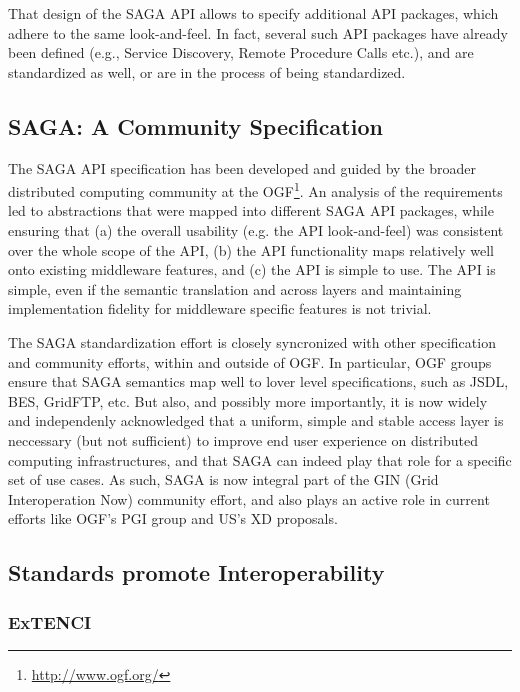 \documentclass[10pt,conference,final,letterpaper,twoside,twocolumn,]{IEEEtran}
\begin{document}
  That design of the SAGA API allows to specify additional API
  packages, which adhere to the same look-and-feel.  In fact, several
  such API packages have already been defined (e.g., Service
  Discovery, Remote Procedure Calls etc.), and are standardized as
  well, or are in the process of being standardized.

 \subsection{SAGA: A Community Specification}

  The SAGA API specification has been developed and guided by the
  broader distributed computing community at the
  OGF\footnote{\url{http://www.ogf.org/}}.  An analysis of the
  requirements led to abstractions that were mapped into different
  SAGA API packages, while ensuring that (a) the overall usability
  (e.g. the API look-and-feel) was consistent over the whole scope of
  the API, (b) the API functionality maps relatively well onto
  existing middleware features, and (c) the API is simple to use.  The
  API is simple, even if the semantic translation and across layers
  and maintaining implementation fidelity for middleware specific
  features is not trivial.

  The SAGA standardization effort is closely syncronized with other
  specification and community efforts, within and outside of OGF.  In
  particular, OGF groups ensure that SAGA semantics map well to lover
  level specifications, such as JSDL, BES, GridFTP, etc.   But also, 
  and possibly more importantly, it is now widely and independenly
  acknowledged that a uniform, simple and stable access layer is
  neccessary (but not sufficient) to improve end user experience on
  distributed computing infrastructures, and that SAGA can indeed play
  that role for a specific set of use cases.  As such, SAGA is now
  integral part of the GIN (Grid Interoperation Now) community effort,
  and also plays an active role in current efforts like OGF's PGI
  group and US's XD proposals.
  


\subsection{Standards promote Interoperability}

 \subsubsection*{ExTENCI}
\end{document}
